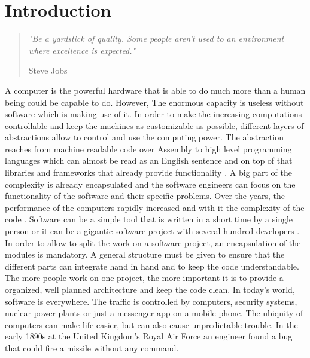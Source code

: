 \chapter{Introduction}

\begin{quote}
\centering 
\em %
"Be a yardstick of quality. Some people aren't used to an environment where excellence is expected."

\medskip
\raggedleft
Steve Jobs
\end{quote}
\vspace{10 mm}

\begin{flushleft}
A computer is the powerful hardware that is able to do much more than a human being could be capable to do. However, The enormous capacity is useless without software which is making use of it. In order to make the increasing computations controllable and keep the machines as customizable as possible, different layers of abstractions allow to control and use the computing power. The abstraction reaches from machine readable code over Assembly to high level programming languages which can almost be read as an English sentence and on top of that libraries and frameworks that already provide functionality \cite{Martin:2008:CCH:1388398}. A big part of the complexity is already encapsulated and the software engineers can focus on the functionality of the software and their specific problems.
\bigbreak
Over the years, the performance of the computers rapidly increased and with it the complexity of the code \cite{wirth2008brief}.
Software can be a simple tool that is written in a short time by a single person or it can be a gigantic software project with several hundred developers \cite{cusumano1997microsoft}.
In order to allow to split the work on a software project, an encapsulation of the modules is mandatory. A general structure must be given to ensure that the different parts can integrate hand in hand and to keep the code understandable. The more people work on one project, the more important it is to provide a organized, well planned architecture and keep the code clean.
\bigbreak
In today's world, software is everywhere. The traffic is controlled by computers, security systems, nuclear power plants or just a messenger app on a mobile phone. 
The ubiquity of computers can make life easier, but can also cause unpredictable trouble.
\bigbreak
In the early 1890s at the United Kingdom's Royal Air Force an engineer found a bug that could fire a missile without any command. \cite{ross2005exterminators}

\end{flushleft}
